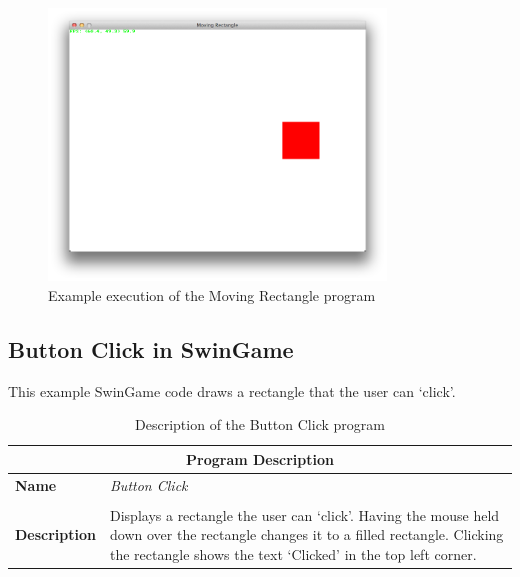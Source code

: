\begin{figure}[h]
   \centering
   \includegraphics[width=0.8\textwidth]{./topics/control-flow/examples/MovingRect.png} 
   \caption{Example execution of the Moving Rectangle program}
   \label{fig:moving-rect-img}
\end{figure}


\clearpage





\clearpage
\subsection{Button Click in SwinGame} %
\label{sub:button_click_in_swingame}

This example SwinGame code draws a rectangle that the user can `click'.

\begin{table}[h]
\centering
\begin{tabular}{l|p{10cm}}
  \hline
  \multicolumn{2}{c}{\textbf{Program Description}} \\
  \hline
  \textbf{Name} & \emph{Button Click} \\
  \\
  \textbf{Description} & Displays a rectangle the user can `click'. Having the mouse held down over the rectangle changes it to a filled rectangle. Clicking the rectangle shows the text `Clicked' in the top left corner. \\
  \hline
\end{tabular}
\caption{Description of the Button Click program}
\label{tbl:flow-button-click}
\end{table}

